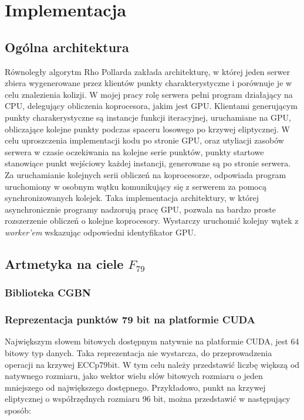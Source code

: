 \newpage
\section{Implementacja}

\subsection*{Ogólna architektura}

Równoległy algorytm Rho Pollarda zakłada architekturę, w której jeden serwer zbiera wygenerowane przez klientów punkty charakterystyczne i porównuje je
w celu znalezienia kolizji. W mojej pracy rolę serwera pełni program działający na CPU, delegujący obliczenia koprocesora, jakim jest GPU.
Klientami generującym punkty charakerystyczne są instancje funkcji iteracyjnej, uruchamiane na GPU, obliczające kolejne punkty podczas spaceru losowego po krzywej eliptycznej.
W celu uproszczenia implementacji kodu po stronie GPU, oraz utyliacji zasobów serwera w czasie oczekiwania na kolejne serie punktów, punkty startowe
stanowiące punkt wejściowy każdej instancji, generowane są po stronie serwera. Za uruchamianie kolejnych serii obliczeń na koprocesorze, odpowiada program uruchomiony w osobnym wątku
komunikujący się z serwerem za pomocą synchronizowanych kolejek.
Taka implementacja architektury, w której asynchronicznie programy nadzorują pracę GPU, pozwala na bardzo proste rozszerzenie obliczeń o kolejne koprocesory.
Wystarczy uruchomić kolejny wątek z \textit{worker'em} wskazując odpowiedni identyfikator GPU.


\subsection*{Artmetyka na ciele $F_{79}$}

\subsubsection{Biblioteka CGBN}

\subsubsection{Reprezentacja punktów 79 bit na platformie CUDA}
Największym słowem bitowych dostępnym natywnie na platformie CUDA, jest 64 bitowy typ danych. Taka reprezentacja nie wystarcza,
do przeprowadzenia operacji na krzywej ECCp79bit. W tym celu należy przedstawić liczbę większą od natywnego rozmiaru, jako wektor wielu słów bitowych
rozmiaru o jeden mniejszego od największego dostępnego.  Przykładowo, punkt na krzywej eliptycznej o współrzędnych rozmiaru 96 bit, można przedstawić w następujący sposób:

